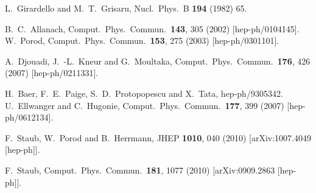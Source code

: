 \documentclass[final,3p,times,pdflatex]{elsarticle}
\begin{document}
\begin{thebibliography}{100}
  L.~Girardello and M.~T.~Grisaru,
  Nucl.\ Phys.\ B {\bf 194} (1982) 65.

  B.~C.~Allanach,
  Comput.\ Phys.\ Commun.\  {\bf 143}, 305 (2002)
  [hep-ph/0104145].
  W.~Porod,
  Comput.\ Phys.\ Commun.\  {\bf 153}, 275 (2003)
  [hep-ph/0301101].

  A.~Djouadi, J.~-L.~Kneur and G.~Moultaka,
  Comput.\ Phys.\ Commun.\  {\bf 176}, 426 (2007)
  [hep-ph/0211331].

  H.~Baer, F.~E.~Paige, S.~D.~Protopopescu and X.~Tata,
  hep-ph/9305342.
  U.~Ellwanger and C.~Hugonie,
  Comput.\ Phys.\ Commun.\  {\bf 177}, 399 (2007)
  [hep-ph/0612134].

  F.~Staub, W.~Porod and B.~Herrmann,
  JHEP {\bf 1010}, 040 (2010)
  [arXiv:1007.4049 [hep-ph]].

  F.~Staub,
  Comput.\ Phys.\ Commun.\  {\bf 181}, 1077 (2010)
  [arXiv:0909.2863 [hep-ph]].


\end{thebibliography}
\end{document}

